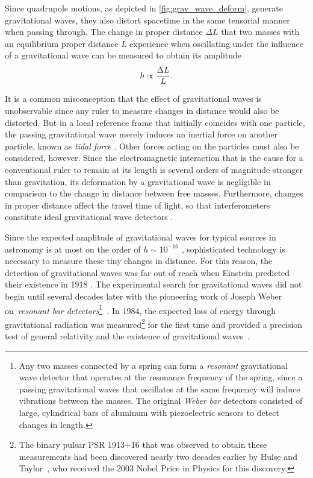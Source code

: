 Since quadrupole motions, as depicted in \autoref{fig:grav_wave_deform}, generate gravitational waves, they also distort spacetime in the same tensorial manner when passing through. The change in proper distance \(\Delta L\) that two masses with an equilibrium proper distance \(L\) experience when oscillating under the influence of a gravitational wave can be measured to obtain its amplitude
\begin{equation}
	h \propto \frac{\Delta L}{L}
	\mathpunct{.}
\end{equation}

It is a common misconception that the effect of gravitational waves is unobservable since any ruler to measure changes in distance would also be distorted. But in a local reference frame that initially coincides with one particle, the passing gravitational wave merely induces an inertial force on another particle, known as \emph{tidal force} \autocite{Schutz}. Other forces acting on the particles must also be considered, however. Since the electromagnetic interaction that is the cause for a conventional ruler to remain at its length is several orders of magnitude stronger than gravitation, its deformation by a gravitational wave is negligible in comparison to the change in distance between free masses. Furthermore, changes in proper distance affect the travel time of light, so that interferometers constitute ideal gravitational wave detectors \autocite{Schutz}.

Since the expected amplitude of gravitational waves for typical sources in astronomy is at most on the order of \(h \sim 10^{-16}\) \autocite{Ju2000,Schutz}, sophisticated technology is necessary to measure these tiny changes in distance. For this reason, the detection of gravitational waves was far out of reach when Einstein predicted their existence in 1918 \autocite{Einstein1918}. The experimental search for gravitational waves did not begin until several decades later with the pioneering work of Joseph Weber on~\emph{resonant bar detectors}\footnote{Any two masses connected by a spring can form a \emph{resonant} gravitational wave detector that operates at the resonance frequency of the spring, since a passing gravitational waves that oscillates at the same frequency will induce vibrations between the masses. The original \emph{Weber bar} detectors \autocite{Weber1960} consisted of large, cylindrical bars of aluminum with piezoelectric sensors to detect changes in length.}~\autocite{Weber1960}. In 1984, the expected loss of energy through gravitational radiation was measured\footnote{The binary pulsar PSR 1913+16 that was observed to obtain these measurements had been discovered nearly two decades earlier by Hulse and Taylor~\autocite{HulseTaylor1975}, who received the 2003 Nobel Price in Physics for this discovery.} for the first time and provided a precision test of general relativity and the existence of gravitational waves~\autocite{Weisberg1984}.

